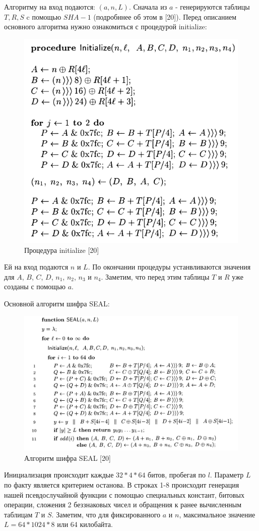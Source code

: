 \documentclass[colorthm]{./civarticle}
\begin{document}
Алгоритму на вход подаются: $(a, n, L)$. Сначала из $a$ - генерируются таблицы $T, R, S$ c помощью $SHA-1$ (подробннее об этом в [20]). Перед описанием основного алгоритма нужно ознакомиться с процедурой initialize:

\begin{figure}[H]
    \centering
    \includegraphics[width=0.5\linewidth]{init.png}
    \caption{Процедура initialize [20]}
    \label{fig:enter-label}
\end{figure}

Ей на вход подаются $n$ и $L$. По окончании процедуры устанвливаются значения для $A$, $B$, $C$, $D$, $n_1$, $n_2$, $n_3$ и $n_4$. Заметим, что перед этим таблицы $T$ и $R$ уже созданы с помощью $a$.

Основной алгоритм шифра SEAL:

\begin{figure}[H]
    \centering
    \includegraphics[width=0.75\linewidth]{Снимок экрана 2024-01-12 010838.png}
    \caption{Алгоритм шифра SEAL [20]}
    \label{fig:enter-label}
\end{figure}

Инициализация происходит каждые $32*4*64$ битов, пробегая по $l$. Параметр $L$ по факту является критерием останова. В строках 1-8 происходит генерация нашей псевдослучайной функции с помощью специальных констант, битовых операции, сложения 2 беззнаковых чисел и обращения к ранее вычисленным таблицам $T$ и $S$. Заметим, что для фиксированного $a$ и $n$, максимальное значение $L = 64 * 1024 * 8$ или 64 килобайта.
\end{document}
